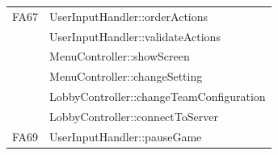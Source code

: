 \begin{center}
	\begin{tabular}{|p{5.5cm}|l|}
		\hline
		FA67 & UserInputHandler::orderActions\\
		& UserInputHandler::validateActions\\
		& MenuController::showScreen\\
		& MenuController::changeSetting\\
		& LobbyController::changeTeamConfiguration\\
		& LobbyController::connectToServer\\\hline
		FA69 & UserInputHandler::pauseGame\\\hline
		
	\end{tabular}
\end{center}
